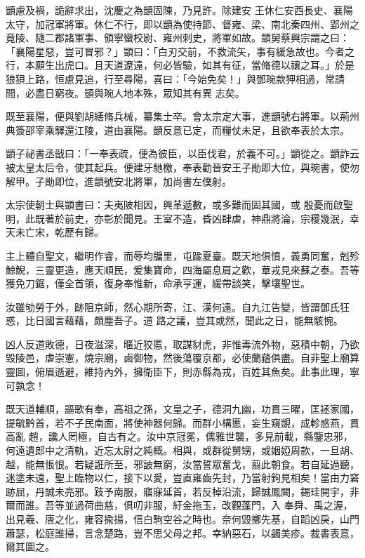 \begin{pinyinscope}
 顗慮及禍，詭辭求出，沈慶之為顗固陳，乃見許。除建安
 王休仁安西長史、襄陽太守，加冠軍將軍。休仁不行，即以顗為使持節、督雍、梁、南北秦四州、郢州之竟陵、隨二郡諸軍事、領寧蠻校尉、雍州刺史，將軍如故。顗舅蔡興宗謂之曰：「襄陽星惡，豈可冒邪？」顗曰：「白刃交前，不救流矢，事有緩急故也。今者之行，本願生出虎口。且天道遼遠，何必皆驗，如其有征，當脩德以禳之耳。」於是狼狽上路，恒慮見追，行至尋陽，喜曰：「今始免矣！」與鄧琬款狎相過，常請間，必盡日窮夜。顗與琬人地本殊，眾知其有異
 志矣。



 既至襄陽，便與劉胡繕脩兵械，纂集士卒。會太宗定大事，進顗號右將軍。以荊州典簽邵宰乘驛還江陵，道由襄陽。顗反意已定，而糧仗未足，且欲奉表於太宗。



 顗子祕書丞戩曰：「一奉表疏，便為彼臣，以臣伐君，於義不可。」顗從之。顗詐云被太皇太后令，使其起兵。便建牙馳檄，奉表勸晉安王子勛即大位，與琬書，使勿解甲。子勛即位，進顗號安北將軍，加尚書左僕射。



 太宗使朝士與顗書曰：夫夷陂相因，興革遞數，或多難而固其國，或
 殷憂而啟聖明，此既著於前史，亦彰於聞見。王室不造，昏凶肆虐，神鼎將淪，宗稷幾泯，幸天未亡宋，乾歷有歸。



 主上體自聖文，繼明作睿，而辱均牖里，屯踰夏臺。既天地俱憤，義勇同奮，剋殄鯨鯢，三靈更造，應天順民，爰集寶命，四海屬息肩之歡，華戎見來蘇之泰。吾等獲免刀鋸，僅全首領，復身奉惟新，命承亨運，緩帶談笑，擊壤聖世。



 汝雖劬勞于外，跡阻京師，然心期所寄，江、漢何遠。自九江告變，皆謂鄧氏狂惑，比日國言藉藉，頗塵吾子。道
 路之議，豈其或然，聞此之日，能無駭惋。



 凶人反道敗德，日夜滋深，暱近狡慝，取謀豺虎，非惟毒流外物，惡積中朝，乃欲毀陵邑，虐崇憲，燒宗廟，鹵御物，然後蕩覆京都，必使蘭蕕俱盡。自非聖上廟算靈圖，俯眉遜避，維持內外，擁衛臣下，則赤縣為戎，百姓其魚矣。此事此理，寧可孰念！



 既天道輔順，謳歌有奉，高祖之孫，文皇之子，德洞九幽，功貫三曜，匡拯家國，提毓黔首，若不子民南面，將使神器何歸。而群小構慝，妄生窺覬，成軫惑燕，貫高亂
 趙，讒人罔極，自古有之。汝中京冠冕，儒雅世襲，多見前載，縣鑒忠邪，何遠遺郎中之清軌，近忘太尉之純概。相與，或群從舅甥，或姻婭周款，一旦胡、越，能無悵恨。若疑誑所至，邪詖無窮，汝當誓眾奮戈，翦此朝食。若自延過聽，迷塗未遠，聖上臨物以仁，接下以愛，豈直雍齒先封，乃當射鉤見相矣！當由力窘跡屈，丹誠未亮邪。跂予南服，寤寐延首，若反棹沿流，歸誠鳳闕，錫珪開宇，非爾而誰。吾等並過荷曲慈，俱叨非服，紆金拖玉，改觀蓬門，入
 奉舜、禹之渥，出見羲、唐之化，雍容揄揚，信白駒空谷之時也。奈何毀擲先基，自蹈凶戾，山門蕭瑟，松庭誰掃，言念楚路，豈不思父母之邦。幸納惡石，以蠲美疹。裁書表意，爾其圖之。




\end{pinyinscope}
